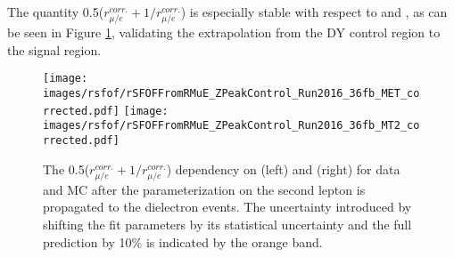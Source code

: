The quantity 0.5($r_{\mu/e}^{corr.}+1/r_{\mu/e}^{corr.}$) is especially stable with respect to \ptmiss and \mttwo, as can be seen in Figure \ref{fig:RDependency}, validating the extrapolation from the DY control region to the signal region.   
\begin{figure}[htbp!]
\begin{center}
    \texttt{[image: images/rsfof/rSFOFFromRMuE\_ZPeakControl\_Run2016\_36fb\_MET\_corrected.pdf]}
    \texttt{[image: images/rsfof/rSFOFFromRMuE\_ZPeakControl\_Run2016\_36fb\_MT2\_corrected.pdf]}
    \caption{The 0.5($r_{\mu/e}^{corr.}+1/r_{\mu/e}^{corr.}$) dependency on \ptmiss (left) and \mttwo (right) for data and MC after the parameterization on the second lepton \pt is propagated to the dielectron events. The uncertainty introduced by shifting the fit parameters by its statistical uncertainty and the full prediction by 10\% is indicated by the orange band.}
\label{fig:RDependency}
\end{center}
\end{figure}                                                                                                                                                                                
